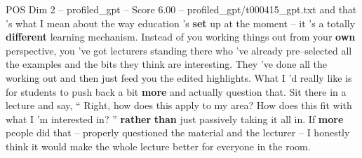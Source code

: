 \begin{textsample}{POS Dim 2 – profiled\_gpt – Score 6.00 – profiled\_gpt/t000415\_gpt.txt}  \label{ex:f2_pos_014}
and that ’s what I mean about the way education ’s \textbf{set} up at the moment – it ’s a totally \textbf{different} learning mechanism.
Instead of you working things out from your \textbf{own} perspective, you ’ve got lecturers standing there who ’ve already pre–selected all the examples and the bits they think are interesting.
They ’ve done all the working out and then just feed you the edited highlights.
What I ’d really like is for students to push back a bit \textbf{more} and actually question that.
Sit there in a lecture and say, “ Right, how does this apply to my area?
How does this fit with what I ’m interested in? ” \textbf{rather} \textbf{than} just passively taking it all in.
If \textbf{more} people did that – properly questioned the material and the lecturer – I honestly think it would make the whole lecture better for everyone in the room.

\end{textsample}
